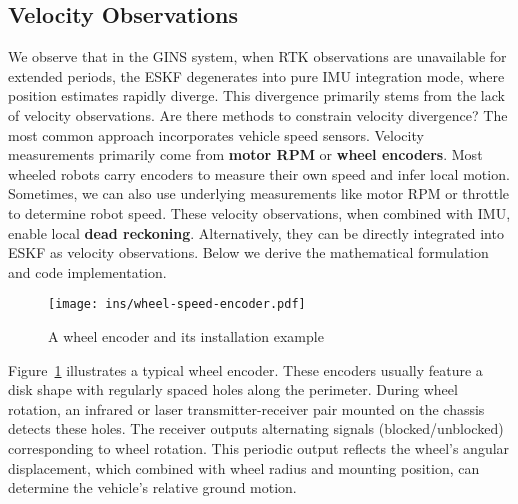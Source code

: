 \subsection{Velocity Observations}
We observe that in the GINS system, when RTK observations are unavailable for extended periods, the ESKF degenerates into pure IMU integration mode, where position estimates rapidly diverge. This divergence primarily stems from the lack of velocity observations. Are there methods to constrain velocity divergence? The most common approach incorporates vehicle speed sensors. Velocity measurements primarily come from \textbf{motor RPM} or \textbf{wheel encoders}. Most wheeled robots carry encoders to measure their own speed and infer local motion. Sometimes, we can also use underlying measurements like motor RPM or throttle to determine robot speed. These velocity observations, when combined with IMU, enable local \textbf{dead reckoning}. Alternatively, they can be directly integrated into ESKF as velocity observations. Below we derive the mathematical formulation and code implementation.

\begin{figure}
\centering
\texttt{[image: ins/wheel-speed-encoder.pdf]}
\caption{A wheel encoder and its installation example}
\label{fig:wheel-speed-encoder}
\end{figure}

Figure~\ref{fig:wheel-speed-encoder} illustrates a typical wheel encoder. These encoders usually feature a disk shape with regularly spaced holes along the perimeter. During wheel rotation, an infrared or laser transmitter-receiver pair mounted on the chassis detects these holes. The receiver outputs alternating signals (blocked/unblocked) corresponding to wheel rotation. This periodic output reflects the wheel's angular displacement, which combined with wheel radius and mounting position, can determine the vehicle's relative ground motion.

